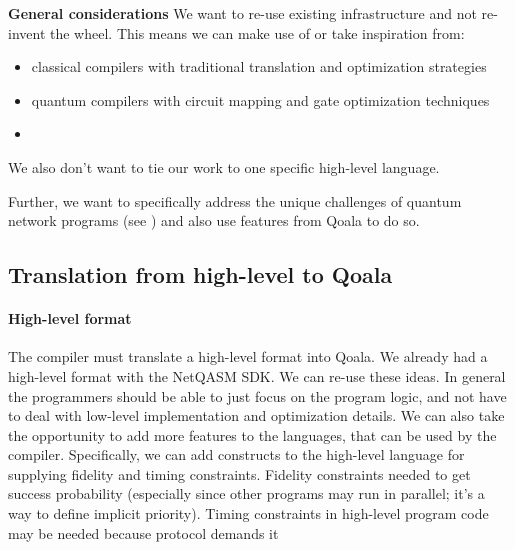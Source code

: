 \textbf{General considerations}
We want to re-use existing infrastructure and not re-invent the wheel. This means we can make use of or take inspiration from:
\begin{itemize}
  \item classical compilers with traditional translation and optimization strategies
  \item quantum compilers with circuit mapping and gate optimization techniques
  \item {}
\end{itemize}

We also don't want to tie our work to one specific high-level language.

Further, we want to specifically address the unique challenges of quantum network programs (see ) and also use features from Qoala to do so.


\subsection{Translation from high-level to Qoala}
\paragraph{High-level format}
The compiler must translate a high-level format into Qoala.
We already had a high-level format with the NetQASM SDK.
We can re-use these ideas.
In general the programmers should be able to just focus on the program logic, and not have to deal with low-level implementation and optimization details.
We can also take the opportunity to add more features to the languages, that can be used by the compiler.
Specifically, we can add constructs to the high-level language for supplying fidelity and timing constraints.
Fidelity constraints needed to get success probability (especially since other programs may run in parallel; it's a way to define implicit priority).
Timing constraints in high-level program code may be needed because protocol demands it

